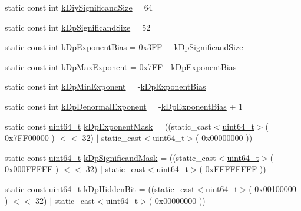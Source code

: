 \begin{DoxyCompactItemize}
\item 
static const int \mbox{\hyperlink{structrapidjson_1_1internal_1_1_diy_fp_a68386239b400931795ef2456d49e108d}{k\+Diy\+Significand\+Size}} = 64
\item 
static const int \mbox{\hyperlink{structrapidjson_1_1internal_1_1_diy_fp_ad0b9b0e3a66741849b9f640f839976f0}{k\+Dp\+Significand\+Size}} = 52
\item 
static const int \mbox{\hyperlink{structrapidjson_1_1internal_1_1_diy_fp_a36911b66284d6c8fd6878857518162ab}{k\+Dp\+Exponent\+Bias}} = 0x3\+F\+F + k\+Dp\+Significand\+Size
\item 
static const int \mbox{\hyperlink{structrapidjson_1_1internal_1_1_diy_fp_ab154a9e79d23e6670a5a4025941b4aba}{k\+Dp\+Max\+Exponent}} = 0x7\+F\+F -\/ k\+Dp\+Exponent\+Bias
\item 
static const int \mbox{\hyperlink{structrapidjson_1_1internal_1_1_diy_fp_adb36355e6aa6a23da0eff2cc36e5d8c5}{k\+Dp\+Min\+Exponent}} = -\/\mbox{\hyperlink{structrapidjson_1_1internal_1_1_diy_fp_a36911b66284d6c8fd6878857518162ab}{k\+Dp\+Exponent\+Bias}}
\item 
static const int \mbox{\hyperlink{structrapidjson_1_1internal_1_1_diy_fp_a2259484dcaec3af62763d07d4f7284cb}{k\+Dp\+Denormal\+Exponent}} = -\/\mbox{\hyperlink{structrapidjson_1_1internal_1_1_diy_fp_a36911b66284d6c8fd6878857518162ab}{k\+Dp\+Exponent\+Bias}} + 1
\item 
static const \mbox{\hyperlink{stdint_8h_aec6fcb673ff035718c238c8c9d544c47}{uint64\+\_\+t}} \mbox{\hyperlink{structrapidjson_1_1internal_1_1_diy_fp_a9ebf259cf0143f8701ec213d1f9b0221}{k\+Dp\+Exponent\+Mask}} = ((static\+\_\+cast$<$\mbox{\hyperlink{stdint_8h_aec6fcb673ff035718c238c8c9d544c47}{uint64\+\_\+t}}$>$( 0x7\+F\+F00000 ) $<$$<$ 32) $\vert$ static\+\_\+cast$<$uint64\+\_\+t$>$( 0x00000000 ))
\item 
static const \mbox{\hyperlink{stdint_8h_aec6fcb673ff035718c238c8c9d544c47}{uint64\+\_\+t}} \mbox{\hyperlink{structrapidjson_1_1internal_1_1_diy_fp_a2144edfd83e1ed1c91ba25a32f06040c}{k\+Dp\+Significand\+Mask}} = ((static\+\_\+cast$<$\mbox{\hyperlink{stdint_8h_aec6fcb673ff035718c238c8c9d544c47}{uint64\+\_\+t}}$>$( 0x000\+F\+F\+F\+F\+F ) $<$$<$ 32) $\vert$ static\+\_\+cast$<$uint64\+\_\+t$>$( 0x\+F\+F\+F\+F\+F\+F\+F\+F ))
\item 
static const \mbox{\hyperlink{stdint_8h_aec6fcb673ff035718c238c8c9d544c47}{uint64\+\_\+t}} \mbox{\hyperlink{structrapidjson_1_1internal_1_1_diy_fp_a1e6bd7e15372bd4a03507e948dc2b242}{k\+Dp\+Hidden\+Bit}} = ((static\+\_\+cast$<$\mbox{\hyperlink{stdint_8h_aec6fcb673ff035718c238c8c9d544c47}{uint64\+\_\+t}}$>$( 0x00100000 ) $<$$<$ 32) $\vert$ static\+\_\+cast$<$uint64\+\_\+t$>$( 0x00000000 ))
\end{DoxyCompactItemize}


